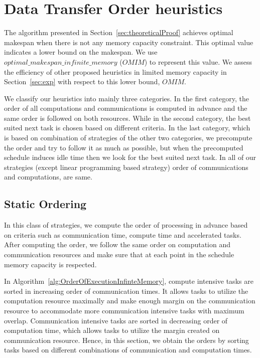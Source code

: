 \documentclass[sigconf]{acmart}
\begin{document}
	
	
	
	
	\section{Data Transfer Order heuristics}
	\label{sec:heuristics}
	
	The algorithm presented in Section~\ref{sec:theoreticalProof} achieves optimal makespan when there is not any memory capacity constraint. This optimal value indicates a lower bound on the makespan. We use $optimal\_ \allowbreak makespan\_  \allowbreak infinite\_  \allowbreak memory$ ($OMIM$) to represent this value. We assess the efficiency of other proposed heuristics in limited memory capacity in Section~\ref{sec:exp} with respect to this lower bound, $OMIM$.
	
	
	We classify our heuristics into mainly three categories. In the first category, the order of all computations and communications is computed in advance and the same order is followed on both resources. While in the second category, the best suited next task is chosen based on different criteria. In the last category, which is based on combination of strategies of the other two categories, we precompute the order and try to follow it as much as possible, but when the precomputed schedule induces idle time then we look for the best suited next task. In all of our strategies (except linear programming based strategy) order of communications and computations, are same.
	
	\subsection{Static Ordering}
	In this class of strategies, we compute the order of processing in advance based on criteria such as communication time, compute time and accelerated tasks. After computing the order, we follow the same order on computation and communication resources and make sure that at each point in the schedule memory capacity is respected.
	
	
	In Algorithm~\ref{alg:OrderOfExecutionInfinteMemory}, compute intensive tasks are sorted in increasing order of communication times. It allows tasks to utilize the computation resource maximally and make enough margin on the communication resource to accommodate more communication intensive tasks with maximum overlap. Communication intensive tasks are sorted in decreasing order of computation time, which allows tasks to utilize the margin created on communication resource. Hence, in this section, we obtain the orders by sorting tasks based on different combinations of communication and computation times.
	
\end{document}
